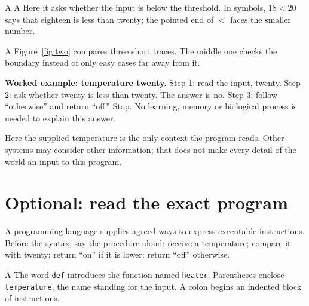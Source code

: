 A  A  Here it asks whether the input is below the threshold. In symbols, \(18<20\) says that eighteen is less than twenty; the pointed end of \(<\) faces the smaller number.

A  Figure~\ref{fig:two} compares three short traces. The middle one checks the boundary instead of only easy cases far away from it.

\textbf{Worked example: temperature twenty.} Step 1: read the input, twenty. Step 2: ask whether twenty is less than twenty. The answer is no. Step 3: follow “otherwise” and return “off.” Stop. No learning, memory or biological process is needed to explain this answer.

 Here the supplied temperature is the only context the program reads. Other systems may consider other information; that does not make every detail of the world an input to this program.


\clearpage
\section{Optional: read the exact program}\label{sec:code}
 A programming language supplies agreed ways to express executable instructions. Before the syntax, say the procedure aloud: receive a temperature; compare it with twenty; return “on” if it is lower; return “off” otherwise.

A  The word \texttt{def} introduces the function named \texttt{heater}. Parentheses enclose \texttt{temperature}, the name standing for the input. A colon begins an indented block of instructions.


